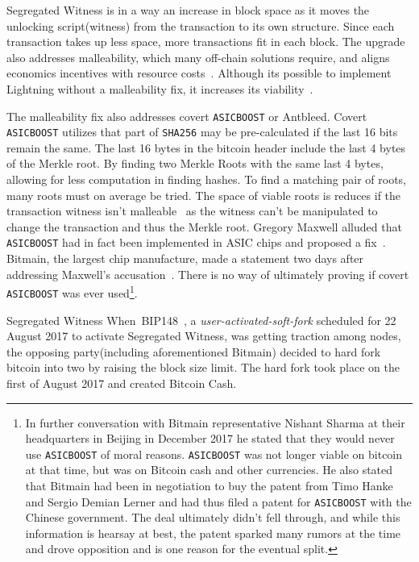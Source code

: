 Segregated Witness is in a way an increase in block space as it moves the unlocking script(witness) from the transaction to its own structure. Since each transaction takes up less space, more transactions fit in each block. The upgrade also addresses malleability, which many off-chain solutions require, and aligns economics incentives with resource costs~\cite{antonopoulos:segregated:witness:align:economic:incentives}. Although its possible to implement Lightning without a malleability fix, it increases its viability~\cite{song:lightning:malleability}.

The malleability fix also addresses covert \texttt{ASICBOOST} or Antbleed. Covert \texttt{ASICBOOST} utilizes that part of \texttt{SHA256} may be pre-calculated if the last 16 bits remain the same. The last 16 bytes in the bitcoin header include the last 4 bytes of the Merkle root. By finding two Merkle Roots with the same last 4 bytes, allowing for less computation in finding hashes. To find a matching pair of roots, many roots must on average be tried. The space of viable roots is reduces if the transaction witness isn't malleable~\cite{song:asicboost} as the witness can't be manipulated to change the transaction and thus the Merkle root. Gregory Maxwell alluded that \texttt{ASICBOOST} had in fact been implemented in ASIC chips and proposed a fix~\cite{maxwell:asicboost:fix}. Bitmain, the largest chip manufacture, made a statement two days after addressing Maxwell's accusation~\cite{bitmain:response}. There is no way of ultimately proving if covert \texttt{ASICBOOST} was ever used\footnote{In further conversation with Bitmain representative Nishant Sharma at their headquarters in Beijing in December 2017 he stated that they would never use \texttt{ASICBOOST} of moral reasons. \texttt{ASICBOOST} was not longer viable on \gls{bitcoin} at that time, but was on Bitcoin cash and other currencies. He also stated that Bitmain had been in negotiation to buy the patent from Timo Hanke and Sergio Demian Lerner and had thus filed a patent for \texttt{ASICBOOST} with the Chinese government. The deal ultimately didn't fell through, and while this information is hearsay at best, the patent sparked many rumors at the time and drove opposition and is one reason for the eventual split.}. 

Segregated Witness When~BIP148~\cite{bip:148:uasf:segwit}, a \textit{user-activated-soft-fork} scheduled for 22 August 2017 to activate Segregated Witness, was getting traction among nodes, the opposing party(including aforementioned Bitmain) decided to hard fork bitcoin into two by raising the block size limit. The hard fork took place on the first of August 2017 and created Bitcoin Cash.

